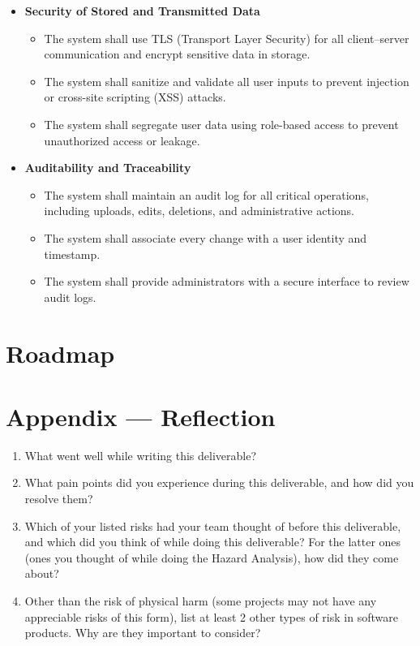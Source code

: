 \documentclass{article}
\begin{document}
\begin{itemize}
    \item \textbf{Security of Stored and Transmitted Data}
    \begin{itemize}
        \item The system shall use TLS (Transport Layer Security) for all client–server communication and encrypt sensitive data in storage.
        \item The system shall sanitize and validate all user inputs to prevent injection or cross-site scripting (XSS) attacks.
        \item The system shall segregate user data using role-based access to prevent unauthorized access or leakage.
    \end{itemize}

    \item \textbf{Auditability and Traceability}
    \begin{itemize}
        \item The system shall maintain an audit log for all critical operations, including uploads, edits, deletions, and administrative actions.
        \item The system shall associate every change with a user identity and timestamp.
        \item The system shall provide administrators with a secure interface to review audit logs.
    \end{itemize}

\end{itemize}

\section{Roadmap}


\newpage{}

\section*{Appendix --- Reflection}




\begin{enumerate}
    \item What went well while writing this deliverable? 
    \item What pain points did you experience during this deliverable, and how
    did you resolve them?
    \item Which of your listed risks had your team thought of before this
    deliverable, and which did you think of while doing this deliverable? For
    the latter ones (ones you thought of while doing the Hazard Analysis), how
    did they come about?
    \item Other than the risk of physical harm (some projects may not have any
    appreciable risks of this form), list at least 2 other types of risk in
    software products. Why are they important to consider?
\end{enumerate}
\end{document}
